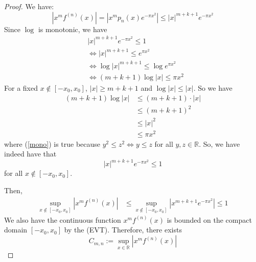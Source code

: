 \documentclass[12pt, reqno]{amsart}
\theoremstyle{definition}
\theoremstyle{remark}
\begin{document}
\begin{itemize}
\begin{itemize}
\begin{proof}
We have:
\[
    |x^m f^{(n)}(x)|=|x^m p_n(x)e^{-\pi x^2}|\le|x|^{m+k+1}e^{-\pi x^{2}}
\]
Since $\log$ is monotonic, we have 
\begin{align*}
&|x|^{m+k+1}e^{-\pi x^{2}} \le  1\\
&\iff |x|^{m+k+1}\le e^{\pi x^{2}}\\
&\iff\log |x|^{m+k+1}\le \log e^{\pi x^{2}}\\
&\iff(m+k+1)\log |x|\le \pi x^{2}
\end{align*}
For a fixed $x\notin[-x_{0},x_{0}]$, $|x|\ge m+k+1$ and $\log |x|\le |x|$. So we have 
\begin{align}
(m+k+1)\log |x|&\le (m+k+1)\cdot|x|\\
&\le (m+k+1)^{2}\\
&\le |x|^{2} \label{mono}
\\&\le \pi x^{2}
\end{align}
where (\ref{mono}) is true because $y^{2}\le z^{2}\iff y\le z$ for all $y,z\in \mathbb{R}$. So, we have indeed have that 
\[
    |x|^{m+k+1}e^{-\pi x^{2}}\le1
\]
for all $x\notin[-x_{0},x_{0}]$.

Then,
\begin{align*}
\sup_{x\notin [-x_{0},x_{0}]}\left|x^{m}f^{(n)}(x)\right|&\le\sup_{x\notin [-x_{0},x_{0}]}\left|x^{m+k+1}e^{-\pi x^{2}}\right|\le1
\end{align*}
We also have the continuous function $x^{m}f^{(n)}(x)$ is bounded on the compact domain $[-x_{0},x_{0}]$ by the (EVT). Therefore, there exists 
\[
C_{m,n}:=\sup_{x\in \mathbb{R}}\left|x^{m}f^{(n)}(x)\right|
\]
\end{proof}

\end{itemize}




\end{itemize}
\end{document}
